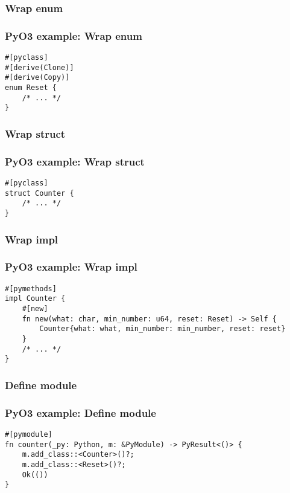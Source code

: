 \documentclass[ignorenonframetext]{beamer}
\begin{document}
\hypertarget{wrap-enum}{%
\subsubsection{Wrap enum}\label{wrap-enum}}

\begin{frame}[fragile]
\frametitle{PyO3 example: Wrap enum}

\begin{lstlisting}
#[pyclass]
#[derive(Clone)]
#[derive(Copy)]
enum Reset {
    /* ... */
}
\end{lstlisting}
\end{frame}

\hypertarget{wrap-struct}{%
\subsubsection{Wrap struct}\label{wrap-struct}}

\begin{frame}[fragile]
\frametitle{PyO3 example: Wrap struct}

\begin{lstlisting}
#[pyclass]
struct Counter {
    /* ... */
}
\end{lstlisting}
\end{frame}

\hypertarget{wrap-impl}{%
\subsubsection{Wrap impl}\label{wrap-impl}}

\begin{frame}[fragile]
\frametitle{PyO3 example: Wrap impl}

\begin{lstlisting}
#[pymethods]
impl Counter {
    #[new]
    fn new(what: char, min_number: u64, reset: Reset) -> Self {
        Counter{what: what, min_number: min_number, reset: reset}
    }
    /* ... */
}
\end{lstlisting}
\end{frame}

\hypertarget{define-module}{%
\subsubsection{Define module}\label{define-module}}

\begin{frame}[fragile]
\frametitle{PyO3 example: Define module}

\begin{lstlisting}
#[pymodule]
fn counter(_py: Python, m: &PyModule) -> PyResult<()> {
    m.add_class::<Counter>()?;
    m.add_class::<Reset>()?;
    Ok(())
}
\end{lstlisting}
\end{frame}
\end{document}
